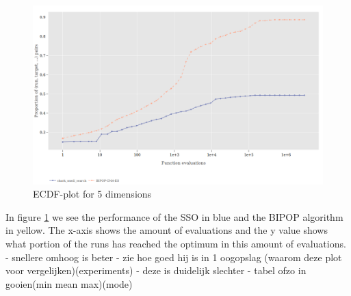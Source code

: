 \documentclass[runningheads]{llncs}
\begin{document}
\begin{figure}[h]
    \centering
    \includegraphics[scale=0.4]{LOOKATTHISGRAPH.png}
    \caption{ECDF-plot for 5 dimensions}
    \label{fig:ECDF}
\end{figure}{}

In figure \ref{fig:ECDF} we see the performance of the SSO in blue and the BIPOP algorithm in yellow. The x-axis shows the amount of evaluations and the y value shows what portion of the runs has reached the optimum in this amount of evaluations. \\

- snellere omhoog is beter
- zie hoe goed hij is in 1 oogopslag (waarom deze plot voor vergelijken)(experiments)
- deze is duidelijk slechter
- tabel ofzo in gooien(min mean max)(mode)





\end{document}
